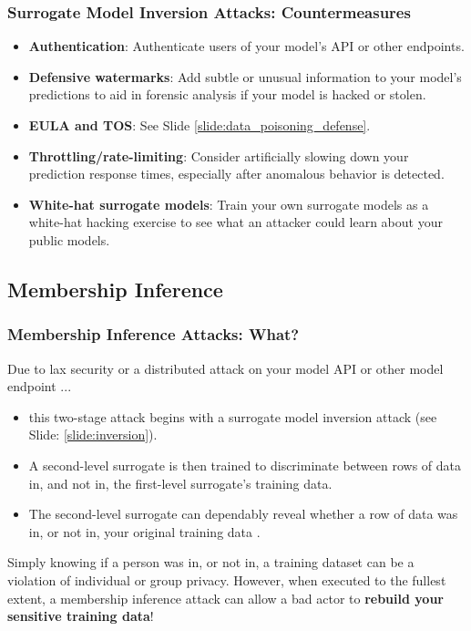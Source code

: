 \documentclass[11pt,
               aspectratio=169,
               hyperref={colorlinks}
               ]{beamer}
\begin{document}
			\begin{frame}[label={slide:inversion_defense}]
		
				\frametitle{Surrogate Model Inversion Attacks: \textbf{Countermeasures}}
				\begin{itemize}
					\item \textbf{Authentication}: Authenticate users of your model’s API or other endpoints.
					\item \textbf{Defensive watermarks}: Add subtle or unusual information to your model’s predictions to aid in forensic analysis if your model is hacked or stolen.
					\item \textbf{EULA and TOS}: See Slide \ref{slide:data_poisoning_defense}.
					\item \textbf{Throttling/rate-limiting}: Consider artificially slowing down your prediction response times, especially after anomalous behavior is detected.
					\item \textbf{White-hat surrogate models}: Train your own surrogate models as a white-hat hacking exercise to see what an attacker could learn about your public models.
				\end{itemize}
				
			\end{frame}
		

		\subsection{Membership Inference}

			\begin{frame}
		
				\frametitle{Membership Inference Attacks: \textbf{What?}}		
				\small Due to lax security or a distributed attack on your model API or other model endpoint ... 
			
				\begin{itemize}
					\item this two-stage attack begins with a surrogate model inversion attack (see Slide: \ref{slide:inversion}).
					\item A second-level surrogate is then trained to discriminate between rows of data in, and not in, the first-level surrogate's training data.
					\item The second-level surrogate can dependably reveal whether a row of data was in, or not in, your original training data \cite{membership_inference}.
				\end{itemize}
				
Simply knowing if a person was in, or not in, a training dataset can be a violation of individual or group privacy. However, when executed to the fullest extent, a membership inference attack can allow a bad actor to \textbf{rebuild your sensitive training data}!\normalsize	

			\end{frame}
	
\end{document}
